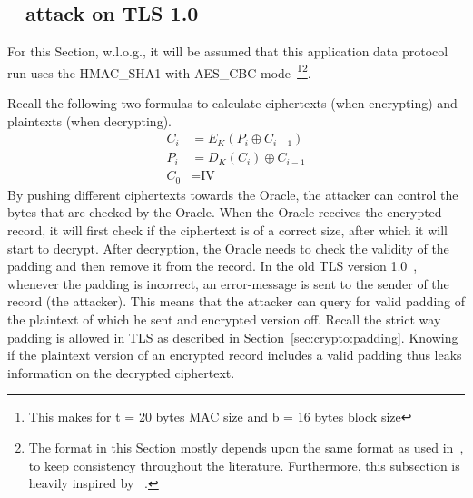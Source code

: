 \documentclass[10pt,conference,a4paper]{IEEEtran}
\begin{document}
\subsection{~\citeauthor{vaudenay2002security} attack on TLS 1.0}
\label{sec:paddingoracle:padding}
For this Section, w.l.o.g., it will be assumed that this application data protocol run uses the HMAC\_SHA1 with AES\_CBC mode~\footnote{This makes for t = 20 bytes MAC size and b = 16 bytes block size}\footnote{The format in this Section mostly depends upon the same format as used in~\cite{alfardan2013lucky}, to keep consistency throughout the literature. Furthermore, this subsection is heavily inspired by ~\cite{alfardan2013lucky,vaudenay2002security}.}.

Recall the following two formulas to calculate ciphertexts (when  encrypting) and plaintexts (when decrypting).
\[
\begin{split}
C_i &= E_K(P_i \oplus C_{i-1}) \\
P_i &= D_K(C_i) \oplus C_{i-1} \\
C_0 &= \text{IV}
\end{split}
\]
By pushing different ciphertexts towards the Oracle, the attacker can control the bytes that are checked by the Oracle. When the Oracle receives the encrypted record, it will first check if the ciphertext is of a correct size, after which it will start to decrypt. After decryption, the Oracle needs to check the validity of the padding and then remove it from the record. In the old TLS version 1.0~\cite{dierks1999rfc}, whenever the padding is incorrect, an error-message is sent to the sender of the record (the attacker). This means that the attacker can query for valid padding of the plaintext of which he sent and encrypted version off. Recall the strict way padding is allowed in TLS as described in Section~\ref{sec:crypto:padding}. Knowing if the plaintext version of an encrypted record includes a valid padding thus leaks information on the decrypted ciphertext.
\end{document}
